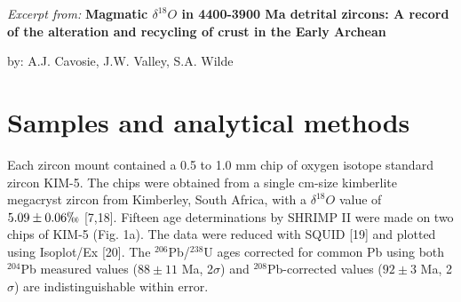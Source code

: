 \documentclass{article}
\begin{document}
	
\textit{Excerpt from:} \textbf{Magmatic $\delta^{18}O$ in 4400-3900 Ma detrital zircons: A record of the alteration and recycling of crust in the Early Archean}

by: A.J. Cavosie, J.W. Valley, S.A. Wilde


\section{Samples and analytical methods}

Each zircon mount contained a 0.5 to 1.0 mm chip of oxygen isotope standard zircon KIM-5. 
The chips were obtained from a single cm-size kimberlite megacryst zircon from Kimberley, South Africa, with a $\delta^{18}O$ value of $5.09\pm0.06\permil$ [7,18].
Fifteen age determinations by SHRIMP II were made on two chips of KIM-5 (Fig. 1a).
The data were reduced with SQUID [19] and plotted using Isoplot/Ex [20]. 
The $^{206}$Pb/$^{238}$U ages corrected for common Pb using both $^{204}$Pb measured values ($88\pm11$ Ma, 2$\sigma$) and  $^{208}$Pb-corrected values ($92\pm3$ Ma, 2$\sigma$) are indistinguishable within error.
\end{document}
